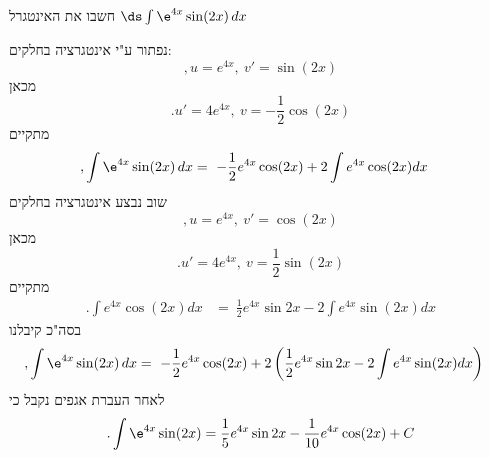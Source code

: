 חשבו את האינטגרל
$\ds \int \e^{4x}\sin(2x) \, dx$
\begin{solbox}
נפתור ע"י אינטגרציה בחלקים:
$$,u=e^{4x},\ v'=\sin(2x)$$
מכאן
$$.u'=4e^{4x},\ v=-\frac{1}{2}\cos(2x)$$
מתקיים
\begin{align*}
    ,\int \e^{4x}\sin(2x) \, dx&=\ -\frac{1}{2}e^{4x}\cos(2x)+2\int e^{4x}\cos(2x)dx
\end{align*}
שוב נבצע אינטגרציה בחלקים
$$,u=e^{4x},\ v'=\cos(2x)$$
מכאן
$$.u'=4e^{4x},\ v=\frac{1}{2}\sin(2x)$$
מתקיים
\begin{align*}
    .\int e^{4x}\cos(2x)dx&=\ \frac{1}{2}e^{4x}\sin{2x}-2\int e^{4x}\sin(2x)dx
\end{align*}
בסה"כ קיבלנו
\begin{align*}
    ,\int \e^{4x}\sin(2x) \, dx&=\ -\frac{1}{2}e^{4x}\cos(2x)+2\left(\frac{1}{2}e^{4x}\sin{2x}-2\int e^{4x}\sin(2x)dx\right)
\end{align*}
לאחר העברת אגפים נקבל כי
$$.\int \e^{4x}\sin(2x)=\frac{1}{5}e^{4x}\sin{2x}-\frac{1}{10}e^{4x}\cos(2x)+C$$

\end{solbox}
